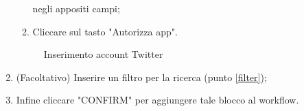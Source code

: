 \begin{enumerate}
\begin{enumerate}
			negli appositi campi;
			\item Cliccare sul tasto "Autorizza app".
		\end{enumerate}
	\begin{figure}[!ht]
		\centering
		\caption{Inserimento account Twitter}
	\end{figure}
	\newpage
	\item (Facoltativo) Inserire un filtro per la ricerca (punto \ref{filter});
	\item Infine cliccare "CONFIRM" per aggiungere tale blocco al workflow.
	\begin{figure}[!ht]
		\centering

\end{figure}
\end{enumerate}
